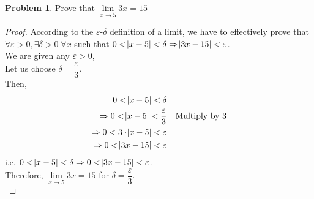 \documentclass[14]{article}
\theoremstyle{definition}
\newtheorem{prob}{Problem}
\theoremstyle{case}
\begin{document}
\begin{prob}
Prove that $\lim\limits_{x \to 5} 3x = 15$
\begin{proof}
According to the $\varepsilon$-$\delta$ definition of a limit, we have to effectively prove that $\forall \varepsilon > 0, \exists \delta > 0 \; \forall x$ such that $0 < \abs{x - 5} < \delta \Rightarrow \abs{3x - 15} < \varepsilon$.\\
We are given any $\varepsilon > 0$,\\
Let us choose $\delta = \dfrac{\varepsilon}{3}$.\\ Then,\\
\begin{align*}
0 < \abs{x - 5} < \delta &&\\
\Rightarrow 0 < \abs{x - 5} < \dfrac\varepsilon 3 && \text{Multiply by } 3\\
\Rightarrow 0 < 3\cdot \abs{x - 5} < \varepsilon\\
\Rightarrow 0 < \abs{3x - 15} < \varepsilon
\end{align*}
i.e. $0 < \abs{x - 5} < \delta \Rightarrow 0 < \abs{3x - 15} < \varepsilon$.\\
Therefore, $\lim\limits_{x \to 5} 3x = 15$ for $\delta = \dfrac{\varepsilon}{3}$.\\
\end{proof}
\end{prob}
\pagebreak
\end{document}
